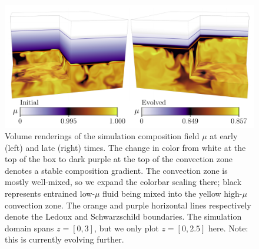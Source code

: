 \documentclass[twocolumn, linenumbers, twocolappendix]{aastex631}
\begin{document}


\begin{figure}[t!]
\centering
\includegraphics[width=\textwidth]{dynamics_figure.pdf}
\caption{
    Volume renderings of the simulation composition field $\mu$ at early (left) and late (right) times.
    The change in color from white at the top of the box to dark purple at the top of the convection zone denotes a stable composition gradient.
    The convection zone is mostly well-mixed, so we expand the colorbar scaling there; black represents entrained low-$\mu$ fluid being mixed into the yellow high-$\mu$ convection zone.
    The orange and purple horizontal lines respectively denote the Ledoux and Schwarzschild boundaries.
    The simulation domain spans $z = [0, 3]$, but we only plot $z = [0, 2.5]$ here.
    {\color{blue} Note: this is currently evolving further.}
\label{fig:dynamics}
}
\end{figure}


\end{document}
